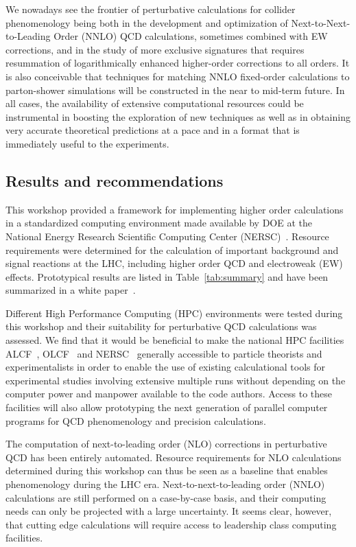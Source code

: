 We nowadays see the frontier of perturbative
calculations for collider phenomenology being both in the
development and optimization of Next-to-Next-to-Leading Order (NNLO)
QCD calculations, sometimes combined with EW corrections, and in the
study of more exclusive signatures that requires resummation 
of logarithmically enhanced higher-order corrections to all orders.
It is also conceivable that techniques for matching NNLO fixed-order 
calculations to parton-shower simulations will be constructed in the 
near to mid-term future. In all cases, the availability 
of extensive computational resources could be instrumental
in boosting the exploration of new techniques as well as in
obtaining very accurate theoretical predictions at a pace and in a
format that is immediately useful to the experiments.

\subsection{Results and recommendations}

This workshop provided a framework for implementing higher order  
calculations in a standardized computing environment made available 
by DOE at the National Energy Research Scientific Computing Center
(NERSC)~\cite{NERSC}.  Resource requirements were determined for the
calculation of important background and signal reactions at the
LHC, including higher order QCD and electroweak (EW) effects. Prototypical results 
are listed in Table~\ref{tab:summary} and have been summarized in a 
white paper~\cite{HPCWP}.

Different High Performance Computing (HPC) environments were tested
during this workshop and their suitability for perturbative QCD calculations 
was assessed. We find that it would be beneficial to make the national HPC 
facilities ALCF~\cite{ALCF}, OLCF~\cite{OLCF} and NERSC~\cite{NERSC} 
generally accessible to particle theorists and
experimentalists in order to enable the use of existing
calculational tools for experimental studies involving extensive
multiple runs without depending on the computer power and manpower
available to the code authors. Access to these facilities will also
allow prototyping the next generation of parallel computer programs
for QCD phenomenology and precision calculations.

The computation of next-to-leading order (NLO) corrections in 
perturbative QCD has been entirely
automated. Resource requirements for NLO calculations determined during 
this workshop can thus be seen as a baseline that enables phenomenology 
during the LHC era. Next-to-next-to-leading order (NNLO) calculations are still performed 
on a case-by-case basis, and their computing needs can only be 
projected with a large uncertainty. It seems clear, however, that cutting edge 
calculations will require access to leadership class computing facilities.

